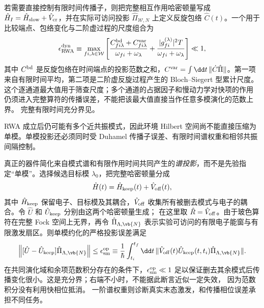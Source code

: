 若需要直接控制有限时间传播子，则把完整相互作用哈密顿量写成 $\hat H_I=\hat H_{\rm slow}+\hat V_{\rm cr}$，并在实际可访问投影 $\hat\Pi_{\mathcal W,N}$ 上定义反旋包络 $\hat C(t)$。一个用于比较端点、包络变化与二阶虚过程的尺度组合为
\begin{equation}
{
\epsilon_{\rm RWA}^{\rm dyn}
\equiv\max_{fi,\lambda\in\mathcal W}
\left[
\frac{C_{fi\lambda}^{\rm bd}+C_{fi\lambda}^{\rm var}}{\omega_{fi}+\omega_\lambda}
+\frac{|g_{fi}^{(\lambda)}|^2T}{\omega_{fi}+\omega_\lambda}
\right]\ll1,}
\label{eq:rwa_projected_dynamical_error}
\end{equation}
其中 $C^{\rm bd}$ 是反旋包络在时间端点的投影范数之和，$C^{\rm var}=\int\dd t\,\|\dot C\hat\Pi\|$。第一项来自有限时间平均，第二项是二阶虚反旋过程产生的 Bloch--Siegert 型累计尺度。
这个逐通道最大值用于筛查尺度；多个通道的占据因子和慢动力学对快项的作用
仍须进入完整算符的传播误差，不能把该最大值直接当作任意多模演化的范数上界。
完整有限时间充分界见。

RWA 成立后仍可能有多个近共振模式，因此环境 Hilbert 空间尚不能直接压缩为单模。单模投影还必须同时受 Duhamel 传播子误差、有限时间谱权重和相邻共振间隔控制。

真正的器件简化来自模式谱和有限作用时间共同产生的\emph{谱投影}，而不是先验指定“单模”。选择候选目标模 $\lambda_0$，把完整哈密顿量分成
\[
\hat H(t)=\hat H_{\rm keep}(t)+\hat V_{\rm off}(t),
\]
其中 $\hat H_{\rm keep}$ 保留电子、目标模及其耦合，$\hat V_{\rm off}$ 收集所有被删去模式与电子的耦合。令 $\hat U$ 和 $\hat U_{\rm keep}$ 分别由这两个哈密顿量生成； 在这里取 $\hat R=\hat V_{\rm off}$。由于玻色算符在完整 Fock 空间上无界，再令 $\hat\Pi_{\Lambda,\vb{N}}$ 表示实验可访问的有限电子能窗与有限激发扇区。则单模约化的严格投影误差满足
\begin{equation}
{
\left\|
[\hat U-\hat U_{\rm keep}]
\hat\Pi_{\Lambda,\vb{N}}
\right\|
\le
\epsilon_{\rm sm}^{\rm op}
\equiv
\frac1\hbar
\int_{t_i}^{t_f}\dd t\,
\|
\hat V_{\rm off}(t)
\hat U_{\rm keep}(t,t_i)
\hat\Pi_{\Lambda,\vb{N}}
\|.}
\label{eq:single_mode_duhamel_error_bound}
\end{equation}
在共同演化域和余项范数积分存在的条件下，$\epsilon_{\rm sm}^{\rm op}\ll1$
足以保证删去其余模式后传播变化很小。这是充分界；右端不小时，不能据此断言近似一定失效，
因为范数积分没有利用快相位抵消。
一阶谱权重则诊断真实末态激发，和传播相位误差承担不同任务。

